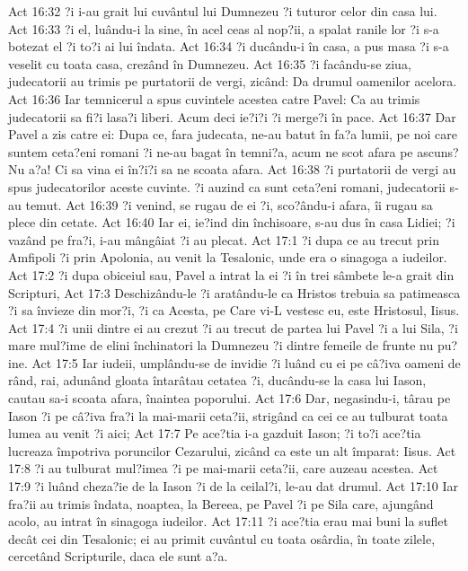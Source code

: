 Act 16:32  ?i i-au grait lui cuvântul lui Dumnezeu ?i tuturor celor din casa lui.
Act 16:33  ?i el, luându-i la sine, în acel ceas al nop?ii, a spalat ranile lor ?i s-a botezat el ?i to?i ai lui îndata.
Act 16:34  ?i ducându-i în casa, a pus masa ?i s-a veselit cu toata casa, crezând în Dumnezeu.
Act 16:35  ?i facându-se ziua, judecatorii au trimis pe purtatorii de vergi, zicând: Da drumul oamenilor acelora.
Act 16:36  Iar temnicerul a spus cuvintele acestea catre Pavel: Ca au trimis judecatorii sa fi?i lasa?i liberi. Acum deci ie?i?i ?i merge?i în pace.
Act 16:37  Dar Pavel a zis catre ei: Dupa ce, fara judecata, ne-au batut în fa?a lumii, pe noi care suntem ceta?eni romani ?i ne-au bagat în temni?a, acum ne scot afara pe ascuns? Nu a?a! Ci sa vina ei în?i?i sa ne scoata afara.
Act 16:38  ?i purtatorii de vergi au spus judecatorilor aceste cuvinte. ?i auzind ca sunt ceta?eni romani, judecatorii s-au temut.
Act 16:39  ?i venind, se rugau de ei ?i, sco?ându-i afara, îi rugau sa plece din cetate.
Act 16:40  Iar ei, ie?ind din închisoare, s-au dus în casa Lidiei; ?i vazând pe fra?i, i-au mângâiat ?i au plecat.
Act 17:1  ?i dupa ce au trecut prin Amfipoli ?i prin Apolonia, au venit la Tesalonic, unde era o sinagoga a iudeilor.
Act 17:2  ?i dupa obiceiul sau, Pavel a intrat la ei ?i în trei sâmbete le-a grait din Scripturi,
Act 17:3  Deschizându-le ?i aratându-le ca Hristos trebuia sa patimeasca ?i sa învieze din mor?i, ?i ca Acesta, pe Care vi-L vestesc eu, este Hristosul, Iisus.
Act 17:4  ?i unii dintre ei au crezut ?i au trecut de partea lui Pavel ?i a lui Sila, ?i mare mul?ime de elini închinatori la Dumnezeu ?i dintre femeile de frunte nu pu?ine.
Act 17:5  Iar iudeii, umplându-se de invidie ?i luând cu ei pe câ?iva oameni de rând, rai, adunând gloata întarâtau cetatea ?i, ducându-se la casa lui Iason, cautau sa-i scoata afara, înaintea poporului.
Act 17:6  Dar, negasindu-i, târau pe Iason ?i pe câ?iva fra?i la mai-marii ceta?ii, strigând ca cei ce au tulburat toata lumea au venit ?i aici;
Act 17:7  Pe ace?tia i-a gazduit Iason; ?i to?i ace?tia lucreaza împotriva poruncilor Cezarului, zicând ca este un alt împarat: Iisus.
Act 17:8  ?i au tulburat mul?imea ?i pe mai-marii ceta?ii, care auzeau acestea.
Act 17:9  ?i luând cheza?ie de la Iason ?i de la ceilal?i, le-au dat drumul.
Act 17:10  Iar fra?ii au trimis îndata, noaptea, la Bereea, pe Pavel ?i pe Sila care, ajungând acolo, au intrat în sinagoga iudeilor.
Act 17:11  ?i ace?tia erau mai buni la suflet decât cei din Tesalonic; ei au primit cuvântul cu toata osârdia, în toate zilele, cercetând Scripturile, daca ele sunt a?a.
